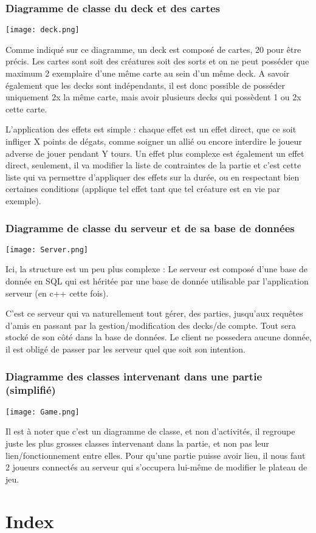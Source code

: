 \documentclass{article}
\begin{document}
		\newpage
		\subsubsection{Diagramme de classe du deck et des cartes}
		\begin{center}\texttt{[image: deck.png]}\end{center}
			Comme indiqué sur ce diagramme, un deck est composé de cartes, 20 pour être précis. Les cartes sont soit des créatures
			soit des sorts et on ne peut posséder que maximum 2 exemplaire d'une même carte au sein d'un même deck.
			A savoir également que les decks sont indépendants, il est donc possible de posséder uniquement 2x la même carte,
			mais avoir plusieurs decks qui possèdent 1 ou 2x cette carte.

			L'application des effets est simple : chaque effet est un effet direct, que ce soit infliger X points de dégats, comme soigner un allié ou encore interdire le joueur adverse de jouer pendant Y tours.
			Un effet plus complexe est également un effet direct, seulement, il va modifier la liste de contraintes de la partie et c'est cette liste qui va permettre d'appliquer des effets sur la durée, ou en respectant bien certaines conditions (applique tel effet tant que tel créature est en vie par exemple).

		\newpage
		\subsubsection{Diagramme de classe du serveur et de sa base de données}
		\begin{center}\texttt{[image: Server.png]}\end{center}
			Ici, la structure est un peu plus complexe : Le serveur est composé d'une base de donnée en SQL qui est héritée par 
			une base de donnée utilisable par l'application serveur (en c++ cette fois).

			C'est ce serveur qui va naturellement tout gérer, des parties, jusqu'aux requêtes d'amis en passant
			par la gestion/modification des decks/de compte. Tout sera stocké de son côté dans la base de données.
			Le client ne possedera aucune donnée, il est obligé de passer par les serveur quel que soit son intention.

		\newpage
		\subsubsection{Diagramme des classes intervenant dans une partie (simplifié)}
		\begin{center}\texttt{[image: Game.png]}\end{center}
			Il est à noter que c'est un diagramme de classe, et non d'activités, il regroupe juste les plus grosses classes intervenant dans la partie,
			et non pas leur lien/fonctionnement entre elles.
			Pour qu'une partie puisse avoir lieu, il nous faut 2 joueurs connectés au serveur qui s'occupera lui-même de modifier le plateau de jeu.

\newpage

\section{Index}
		\printglossary[type=glossary, style=Index, title=]
\end{document}
